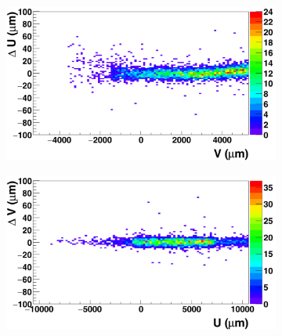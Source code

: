       \begin{figure}[!tbh]
        \centering
        \begin{subfigure}[t]{0.45\textwidth}
        \centering
          \includegraphics[width = 1.2\textwidth]{Pictures/deformation/deltaUV_8_corrected1.png}
          \caption{}
          \label{fig:scatterDUV_corrected_front}
        \end{subfigure}
        \hfill
        \begin{subfigure}[t]{0.45\textwidth}
          \centering
          \includegraphics[width = 1.2\textwidth]{Pictures/deformation/deltaVU_8_corrected1.png}
          \caption{}
          \label{fig:scatterDVU_corrected}
        \end{subfigure}


\end{figure}

